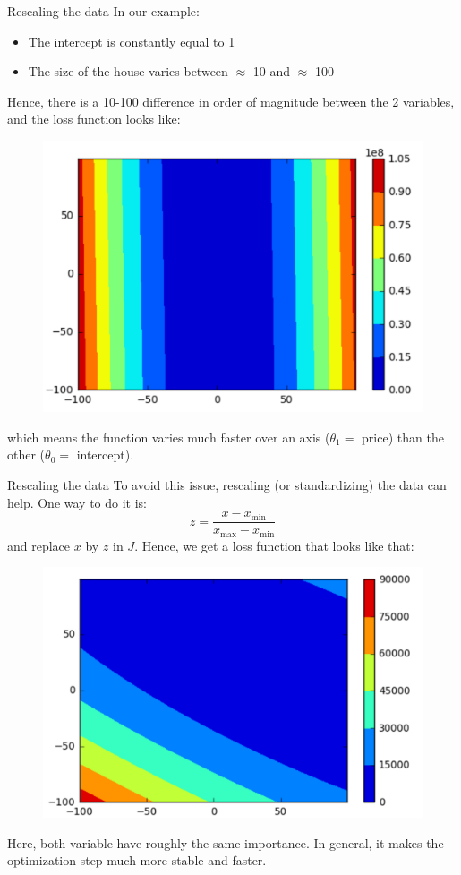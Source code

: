 \documentclass{beamer}
\newcommand{\1}[1]{\mathbbm{1}\left[#1\right]}
\begin{document}
\begin{frame}{Rescaling the data} 
In our example:
\begin{itemize}
	\item The intercept is constantly equal to 1
	\item The size of the house varies between $\approx$ 10 and $\approx$ 100
\end{itemize}
Hence, there is a 10-100 difference in order of magnitude between the 2 variables, and the loss function looks like: 
\begin{figure}
\centering
\includegraphics[width=.6\linewidth]{images/unnormalized_loss.png}
\end{figure}
which means the function varies much faster over an axis ($\theta_1 = $ price) than the other ($\theta_0 = $ intercept).
\end{frame}

\begin{frame}{Rescaling the data}
To avoid this issue, rescaling (or standardizing) the data can help. One way to do it is:
$$ z = \dfrac{x - x_{\min}}{x_{\max} - x_{\min}} $$
and replace $x$ by $z$ in $J$. Hence, we get a loss function that looks like that:
\begin{figure}
\centering
\includegraphics[width=.6\linewidth]{images/normalized_loss.png}
\end{figure}
Here, both variable have roughly the same importance. In general, it makes the optimization step much more stable and faster.
\end{frame}
\end{document}
